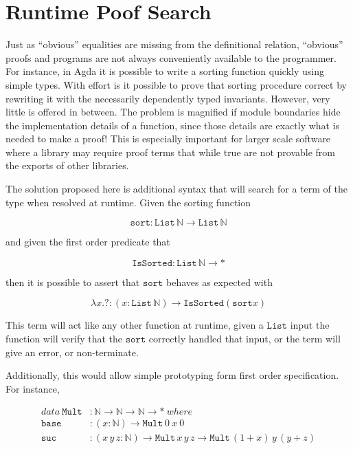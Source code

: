 \section{Runtime Poof Search}

Just as ``obvious'' equalities are missing from the definitional
relation, ``obvious'' proofs and programs are not always conveniently
available to the programmer. For instance, in Agda it is possible
to write a sorting function quickly using simple types. With effort
is it possible to prove that sorting procedure correct by rewriting
it with the necessarily dependently typed invariants. However, very
little is offered in between. The problem is magnified if module boundaries
hide the implementation details of a function, since those details
are exactly what is needed to make a proof! This is especially important
for larger scale software where a library may require proof terms
that while true are not provable from the exports of other libraries.

The solution proposed here is additional syntax that will search for
a term of the type when resolved at runtime. Given the sorting function 

\[
\mathtt{sort}:\mathtt{List}\,\mathbb{N}\rightarrow\mathtt{List}\,\mathbb{N}
\]

and given the first order predicate that 

\[
\mathtt{IsSorted}:\mathtt{List}\,\mathbb{N}\rightarrow*
\]

then it is possible to assert that $\mathtt{sort}$ behaves as expected
with

\[
\lambda x.?:\left(x:\mathtt{List}\,\mathbb{N}\right)\rightarrow\mathtt{IsSorted}\left(\mathtt{sort}x\right)
\]

This term will act like any other function at runtime, given a $\mathtt{List}$
input the function will verify that the $\mathtt{sort}$ correctly
handled that input, or the term will give an error, or non-terminate.

Additionally, this would allow simple prototyping form first order
specification. For instance,

\begin{align*}
data\ \mathtt{Mult} & :\mathbb{N}\rightarrow\mathbb{N}\rightarrow\mathbb{N}\rightarrow*\ where\\
\mathtt{base} & :\left(x:\mathbb{N}\right)\rightarrow\mathtt{Mult}\ 0\ x\ 0\\
\mathtt{suc} & :\left(x\,y\,z:\mathbb{N}\right)\rightarrow\mathtt{Mult}\,x\,y\,z\rightarrow\mathtt{Mult}\,\left(1+x\right)\,y\,(y+z)
\end{align*}

